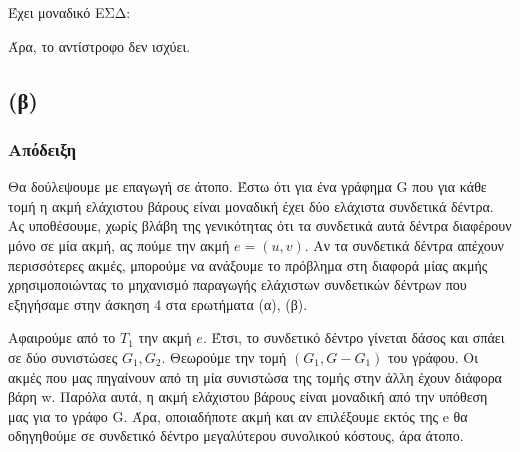 \documentclass[a4paper,oneside, 11pt]{article}
\begin{document}
Έχει μοναδικό ΕΣΔ:
\begin{center}
\end{center}
Άρα, το αντίστροφο δεν ισχύει.
\subsection{(β)}
\subsubsection{Απόδειξη}
Θα δούλεψουμε με επαγωγή σε άτοπο. Έστω ότι για ένα γράφημα G που για κάθε τομή η ακμή ελάχιστου βάρους είναι μοναδική έχει δύο ελάχιστα συνδετικά δέντρα. Ας υποθέσουμε, χωρίς βλάβη της γενικότητας ότι τα συνδετικά αυτά δέντρα διαφέρουν μόνο σε μία ακμή, ας πούμε την ακμή $e = (u,v)$. Αν τα συνδετικά δέντρα απέχουν περισσότερες ακμές, μπορούμε να ανάξουμε το πρόβλημα στη διαφορά μίας ακμής χρησιμοποιώντας το μηχανισμό παραγωγής ελάχιστων συνδετικών δέντρων που εξηγήσαμε στην άσκηση 4 στα ερωτήματα (α), (β). \bigbreak 

Αφαιρούμε από το $T_1$ την ακμή $e$. Έτσι, το συνδετικό δέντρο γίνεται δάσος και σπάει σε δύο συνιστώσες $G_1, G_2$. Θεωρούμε την τομή $(G_1, G - G_1)$ του γράφου. Οι ακμές που μας πηγαίνουν από τη μία συνιστώσα της τομής στην άλλη έχουν διάφορα βάρη w. Παρόλα αυτά, η ακμή ελάχιστου βάρους είναι μοναδική από την υπόθεση μας για το γράφο G. Άρα, οποιαδήποτε ακμή και αν επιλέξουμε εκτός της e θα οδηγηθούμε σε συνδετικό δέντρο μεγαλύτερου συνολικού κόστους, άρα άτοπο. \bigbreak 
\end{document}
